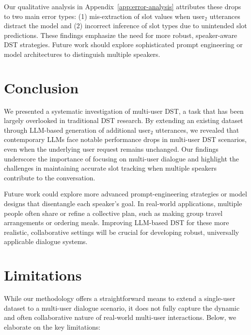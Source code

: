 \documentclass[11pt]{article}
\begin{document}
Our qualitative analysis in Appendix~\ref{app:error-analysis} attributes these drops to two main error types: (1) mis-extraction of slot values when user$_2$ utterances distract the model and (2) incorrect inference of slot types due to unintended slot predictions. These findings emphasize the need for more robust, speaker-aware DST strategies. Future work should explore sophisticated prompt engineering or model architectures to distinguish multiple speakers.

\section{Conclusion}
\label{sec:conclusion}

We presented a systematic investigation of multi-user DST, a task that has been largely overlooked in traditional DST research. By extending an existing dataset through LLM-based generation of additional user$_2$ utterances, we revealed that contemporary LLMs face notable performance drops in multi-user DST scenarios, even when the underlying user request remains unchanged. Our findings underscore the importance of focusing on multi-user dialogue and highlight the challenges in maintaining accurate slot tracking when multiple speakers contribute to the conversation. 

Future work could explore more advanced prompt-engineering strategies or model designs that disentangle each speaker’s goal. In real-world applications, multiple people often share or refine a collective plan, such as making group travel arrangements or ordering meals. Improving LLM-based DST for these more realistic, collaborative settings will be crucial for developing robust, universally applicable dialogue systems.

\newpage
\section*{Limitations}

While our methodology offers a straightforward means to extend a single-user dataset to a multi-user dialogue scenario, it does not fully capture the dynamic and often collaborative nature of real-world multi-user interactions. Below, we elaborate on the key limitations:
\end{document}
